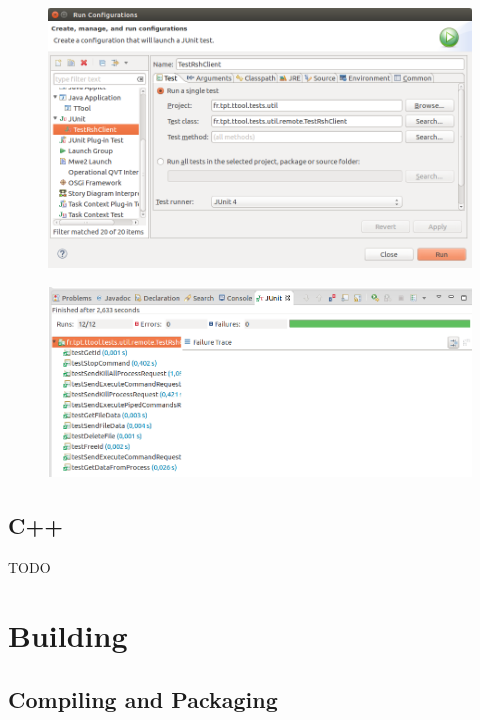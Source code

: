 \documentclass[12pt]{article}
\begin{document}
\begin{figure}[H]
\begin{center}
\includegraphics[width=\textwidth]{images/image13.png}
\end{center}
\caption{}
\label{fig:image13}
\end{figure}

\begin{figure}[H]
\begin{center}
\includegraphics[width=\textwidth]{images/image14.png}
\end{center}
\caption{}
\label{fig:image14}
\end{figure}

\subsection{C++}

TODO

\section{Building}

\subsection{Compiling and Packaging}
\end{document}
